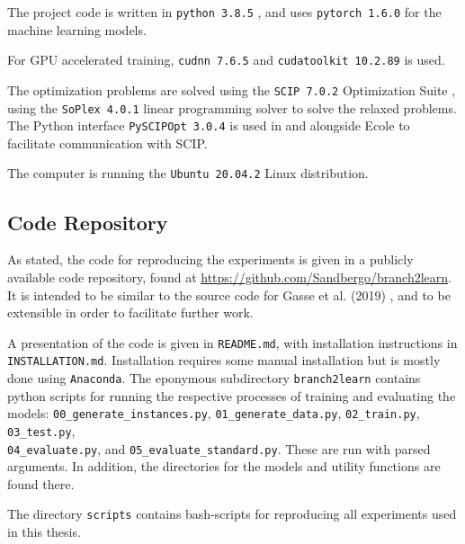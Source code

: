 The project code is written in 
\verb|python 3.8.5| \cite{rossum2009python}, and uses               
\verb|pytorch 1.6.0| \cite{paszke2019pytorch} for the machine learning models.           

For \gls{GPU} accelerated training, 
\verb|cudnn 7.6.5| and 
\verb|cudatoolkit 10.2.89| \cite{kirk2008nvidia} is used. 

The optimization problems are solved using the \verb|SCIP 7.0.2| Optimization Suite \cite{gamrath2020scip}, using the 
\verb|SoPlex 4.0.1| \cite{wunderling1996soplex} linear programming solver to solve the relaxed problems. The Python interface
\verb|PySCIPOpt 3.0.4| \cite{maher2016pyscipopt} is used in and alongside \gls{Ecole} to facilitate communication with \gls{SCIP}.

The computer is running the \verb|Ubuntu 20.04.2| Linux distribution.


\subsection{Code Repository}

As stated, the code for reproducing the experiments is given in a publicly available code repository, found at \url{https://github.com/Sandbergo/branch2learn}. It is intended to be similar to the source code for Gasse et al. (2019) \cite{gasse2019exact}, and to be extensible in order to facilitate further work. 

A presentation of the code is given in \verb|README.md|, with installation instructions in \verb|INSTALLATION.md|. Installation requires some manual installation but is mostly done using \verb|Anaconda|. The eponymous subdirectory \verb|branch2learn| contains python scripts for running the respective processes of training and evaluating the models: \verb|00_generate_instances.py|, \verb|01_generate_data.py|, \verb|02_train.py|,
\verb|03_test.py|, \\
\verb|04_evaluate.py|, and \verb|05_evaluate_standard.py|.  These are run with parsed arguments. In addition, the directories for the models and utility functions are found there.

The directory \verb|scripts| contains bash-scripts for reproducing all experiments used in this thesis. 